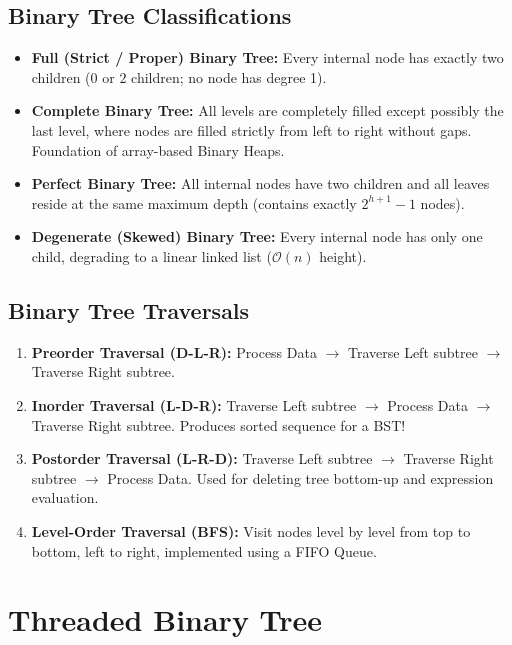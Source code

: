 \documentclass[12pt,a4paper]{article}
\begin{document}
\subsection{Binary Tree Classifications}
\begin{itemize}[leftmargin=*, itemsep=3pt]
  \item \textbf{Full (Strict / Proper) Binary Tree:} Every internal node has exactly two children ($0$ or $2$ children; no node has degree 1).
  \item \textbf{Complete Binary Tree:} All levels are completely filled except possibly the last level, where nodes are filled strictly from left to right without gaps. Foundation of array-based Binary Heaps.
  \item \textbf{Perfect Binary Tree:} All internal nodes have two children and all leaves reside at the same maximum depth (contains exactly $2^{h+1}-1$ nodes).
  \item \textbf{Degenerate (Skewed) Binary Tree:} Every internal node has only one child, degrading to a linear linked list ($\mathcal{O}(n)$ height).
\end{itemize}

\subsection{Binary Tree Traversals}
\begin{enumerate}[leftmargin=*, itemsep=3pt]
  \item \textbf{Preorder Traversal (D-L-R):} Process Data $\to$ Traverse Left subtree $\to$ Traverse Right subtree.
  \item \textbf{Inorder Traversal (L-D-R):} Traverse Left subtree $\to$ Process Data $\to$ Traverse Right subtree. Produces sorted sequence for a BST!
  \item \textbf{Postorder Traversal (L-R-D):} Traverse Left subtree $\to$ Traverse Right subtree $\to$ Process Data. Used for deleting tree bottom-up and expression evaluation.
  \item \textbf{Level-Order Traversal (BFS):} Visit nodes level by level from top to bottom, left to right, implemented using a FIFO Queue.
\end{enumerate}

\section{Threaded Binary Tree}
\end{document}
